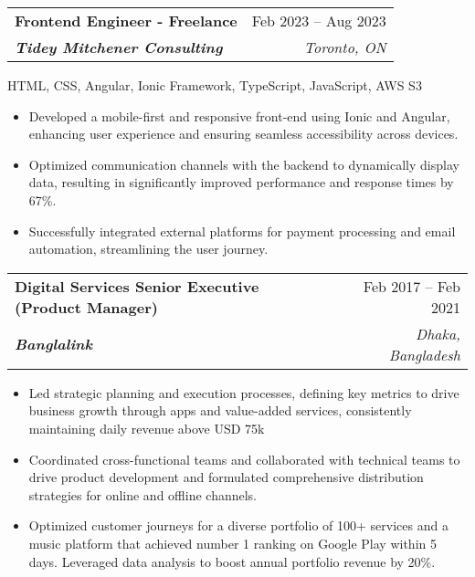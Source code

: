\documentclass[letterpaper,11pt]{article}
\makeatletter
\newcommand{\resumeItem}[1]{
  \item\small{
    {#1 \vspace{-2pt}}
  }
}
\newcommand{\resumeSubheading}[4]{
  \vspace{-2pt}\item
    \begin{tabular*}{0.97\textwidth}[t]{l@{\extracolsep{\fill}}r}
      \textbf{#1} & #2 \\
      \textit{\small#3} & \textit{\small #4} \\
    \end{tabular*}\vspace{-7pt}
}
\newcommand{\resumeItemListStart}{\begin{itemize}}
\newcommand{\resumeItemListEnd}{\end{itemize}\vspace{-5pt}}
\makeatother
\begin{document}
     \vspace{4pt}
    \resumeSubheading
      {Frontend Engineer - Freelance}{Feb 2023 -- Aug 2023}
      {\textbf{Tidey Mitchener Consulting}}{Toronto, ON}
    \begin{itemize}[leftmargin=0, label={}]
        \footnotesize{\item{
         {HTML, CSS, Angular, Ionic Framework, TypeScript, JavaScript, AWS S3} \\
        }}
    \end{itemize}
      \resumeItemListStart
        \resumeItem{Developed a mobile-first and responsive front-end using Ionic and Angular, enhancing user experience and ensuring seamless accessibility across devices.}
        \resumeItem{Optimized communication channels with the backend to dynamically display data, resulting in significantly improved performance and response times by 67\%.}
        \resumeItem{Successfully integrated external platforms for payment processing and email automation, streamlining the user journey.}
      \resumeItemListEnd

     \vspace{4pt}
    \resumeSubheading
      {Digital Services Senior Executive (Product Manager)}{Feb 2017 – Feb 2021}
      {\textbf{Banglalink}}{Dhaka, Bangladesh}
       \vspace{4pt}
      \resumeItemListStart
        \resumeItem{Led strategic planning and execution processes, defining key metrics to drive business growth through apps and value-added services, consistently maintaining daily revenue above USD 75k}
        \resumeItem{Coordinated cross-functional teams and collaborated with technical teams to drive product development and formulated comprehensive distribution strategies for online and offline channels.}
        \resumeItem{Optimized customer journeys for a diverse portfolio of 100+ services and a music platform that achieved number 1 ranking on Google Play within 5 days. Leveraged data analysis to boost annual portfolio revenue by 20\%.}
    \resumeItemListEnd
\end{document}

